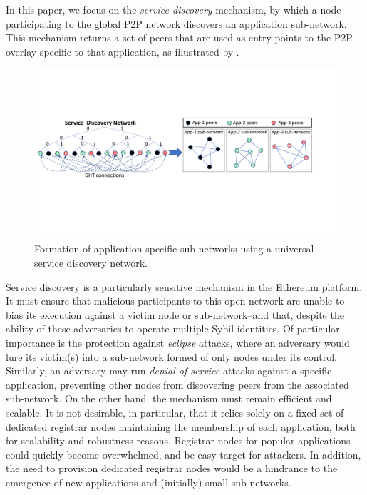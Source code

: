 In this paper, we focus on the \emph{service discovery} mechanism, by which a node participating to the global P2P network discovers an application sub-network.
This mechanism returns a set of peers that are used as entry points to the P2P overlay specific to that application, as illustrated by .

\begin{figure}[b!]
    \includegraphics[width=1\linewidth]{img/subnetwork}
    \caption{Formation of application-specific sub-networks using a universal service discovery network.
    }
    \label{fig:subnetwork}
\end{figure}

Service discovery is a particularly sensitive mechanism in the Ethereum platform.
It must ensure that malicious participants to this open network are unable to bias its execution against a victim node or sub-network--and that, despite the ability of these adversaries to operate multiple Sybil identities.
Of particular importance is the protection against \emph{eclipse} attacks, where an adversary would lure its victim(s) into a sub-network formed of only nodes under its control. %
Similarly, an adversary may run \emph{denial-of-service} attacks against a specific application, preventing other nodes from discovering peers from the associated sub-network.
On the other hand, the mechanism must remain efficient and scalable.
It is not desirable, in particular, that it relies solely on a fixed set of dedicated registrar nodes maintaining the membership of each application, both for scalability and robustness reasons. Registrar nodes for popular applications could quickly become overwhelmed, and be easy target for attackers.
In addition, the need to provision dedicated registrar nodes would be a hindrance to the emergence of new applications and (initially) small sub-networks.

